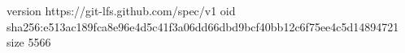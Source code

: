 version https://git-lfs.github.com/spec/v1
oid sha256:e513ac189fca8e96e4d5c41f3a06dd66dbd9bcf40bb12c6f75ee4c5d14894721
size 5566
